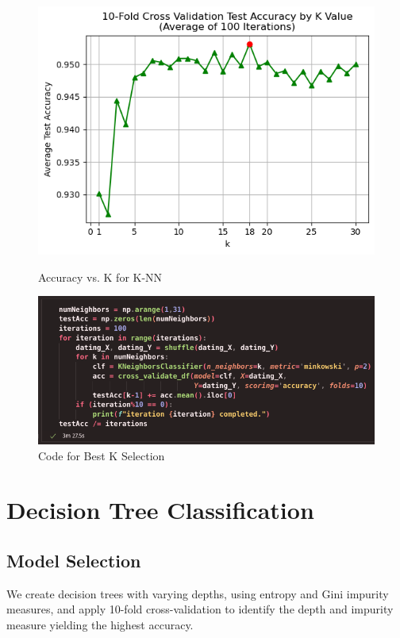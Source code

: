 \documentclass{article}
\begin{document}
\begin{figure}[H]
    \centering
    \begin{minipage}[b]{0.49\textwidth}
        \centering
        \includegraphics[width=\textwidth]{k-NN_selection.png}
        \caption{Accuracy vs. K for K-NN}
    \end{minipage}
    \hfill
    \begin{minipage}[b]{0.49\textwidth}
        \centering
        \includegraphics[width=\textwidth]{k-NN_selection_code.png}
        \caption{Code for Best K Selection}
    \end{minipage}
\end{figure}

\newpage

\section{Decision Tree Classification}
\subsection{Model Selection}
We create decision trees with varying depths, using entropy and Gini impurity measures, and apply 10-fold cross-validation to identify the depth and impurity measure yielding the highest accuracy.
\end{document}
